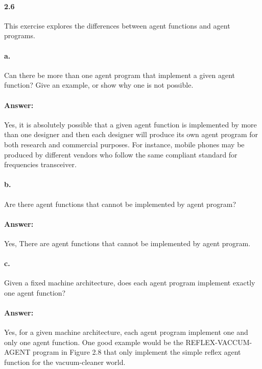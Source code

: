 \documentclass[a4paper]{article}
\begin{document}
\paragraph{2.6}
This exercise explores the differences between agent functions and agent programs.

\paragraph{a.}
Can there be more than one agent program that implement a given agent function? Give an example, or show why one is not possible.

\paragraph{Answer:}
Yes, it is absolutely possible that a given agent function is implemented by more than one designer and then each designer will produce 
its own agent program for both research and commercial purposes. For instance, mobile phones may be produced by different vendors 
who follow the same compliant standard for frequencies transceiver.

\paragraph{b.}
Are there agent functions that cannot be implemented by agent program?

\paragraph{Answer:}
Yes, There are agent functions that cannot be implemented by agent program.

\paragraph{c.}
Given a fixed machine architecture, does each agent program implement exactly one agent function?

\paragraph{Answer:}
Yes, for a given machine architecture, each agent program implement one and only one agent function. One good example would be the REFLEX-VACCUM-AGENT program in Figure 2.8 that only implement the simple reflex agent function for the vacuum-cleaner world.
\end{document}
